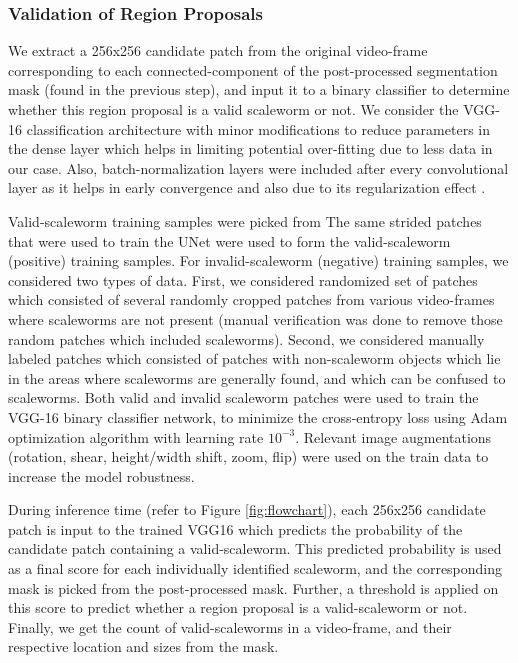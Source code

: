 \documentclass[10pt,twocolumn,letterpaper]{article}
\begin{document}
\subsubsection{Validation of Region Proposals}
We extract a 256x256 candidate patch from the original video-frame corresponding to each connected-component of the post-processed segmentation mask (found in the previous step), and input it to a binary classifier to determine whether this region proposal is a valid scaleworm or not. We consider the VGG-16 \cite{vgg16} classification architecture with minor modifications to reduce parameters in the dense layer which helps in limiting potential over-fitting due to less data in our case. Also, batch-normalization layers were included after every convolutional layer as it helps in early convergence and also due to its regularization effect \cite{batchnorm}.

Valid-scaleworm training samples were picked from The same strided patches that were used to train the UNet were used to form the valid-scaleworm (positive) training samples. For invalid-scaleworm (negative) training samples, we considered two types of data. First, we considered randomized set of patches which consisted of several randomly cropped patches from various video-frames where scaleworms are not present (manual verification was done to remove those random patches which included scaleworms). Second, we considered manually labeled patches which consisted of patches with non-scaleworm objects which lie in the areas where scaleworms are generally found, and which can be confused to scaleworms. Both valid and invalid scaleworm patches were used to train the VGG-16 binary classifier network, to minimize the cross-entropy loss using Adam optimization algorithm with learning rate $10^{-3}$. Relevant image augmentations (rotation, shear, height/width shift, zoom, flip) were used on the train data to increase the model robustness.

During inference time (refer to Figure \ref{fig:flowchart}), each 256x256 candidate patch is input to the trained VGG16 which predicts the probability of the candidate patch containing a valid-scaleworm. This predicted probability is used as a final score for each individually identified scaleworm, and the corresponding mask is picked from the post-processed mask. Further, a threshold is applied on this score to predict whether a region proposal is a valid-scaleworm or not. Finally, we get the count of valid-scaleworms in a video-frame, and their respective location and sizes from the mask.
\end{document}
